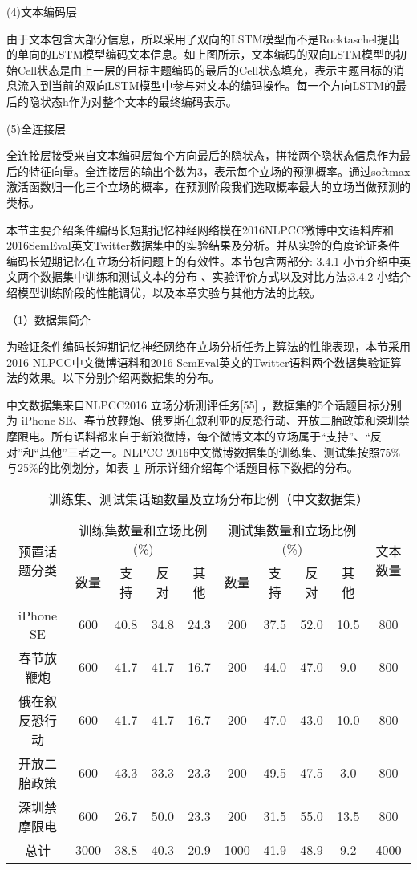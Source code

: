 (4)文本编码层

由于文本包含大部分信息，所以采用了双向的LSTM模型而不是Rocktaschel提出的单向的LSTM模型编码文本信息。如上图所示，文本编码的双向LSTM模型的初始Cell状态是由上一层的目标主题编码的最后的Cell状态填充，表示主题目标的消息流入到当前的双向LSTM模型中参与对文本的编码操作。每一个方向LSTM的最后的隐状态h作为对整个文本的最终编码表示。

(5)全连接层


全连接层接受来自文本编码层每个方向最后的隐状态，拼接两个隐状态信息作为最后的特征向量。全连接层的输出个数为3，表示每个立场的预测概率。通过softmax激活函数归一化三个立场的概率，在预测阶段我们选取概率最大的立场当做预测的类标。


本节主要介绍条件编码长短期记忆神经网络模在2016NLPCC微博中文语料库和2016SemEval英文Twitter数据集中的实验结果及分析。并从实验的角度论证条件编码长短期记忆在立场分析问题上的有效性。本节包含两部分: 3.4.1 小节介绍中英文两个数据集中训练和测试文本的分布 、实验评价方式以及对比方法;3.4.2 小结介绍模型训练阶段的性能调优，以及本章实验与其他方法的比较。


（1）数据集简介

为验证条件编码长短期记忆神经网络在立场分析任务上算法的性能表现，本节采用2016 NLPCC中文微博语料和2016 SemEval英文的Twitter语料两个数据集验证算法的效果。以下分别介绍两数据集的分布。

中文数据集来自NLPCC2016 立场分析测评任务[55] ，数据集的5个话题目标分别为 iPhone SE、春节放鞭炮、俄罗斯在叙利亚的反恐行动、开放二胎政策和深圳禁摩限电。所有语料都来自于新浪微博，每个微博文本的立场属于“支持”、“反对”和“其他”三者之一。NLPCC 2016中文微博数据集的训练集、测试集按照75\%与25\%的比例划分，如表~\ref{chinesedata}~所示详细介绍每个话题目标下数据的分布。
\begin{table}[htbp]
	\caption[table123]{训练集、测试集话题数量及立场分布比例（中文数据集）}
	\label{chinesedata}
	\vspace{0.5em}\centering\wuhao
	\begin{tabular}{cccccccccc}
		\toprule[1.5pt]
		\multirow{2}{*}{预置话题分类}& \multicolumn{4}{c}{训练集数量和立场比例(\%)} 
		& \multicolumn{4}{c}{测试集数量和立场比例(\%)}  &\multirow{2}{*}{文本数量}\\
		\cline{2-9}
		\quad&数量& 支持&反对&其他&数量& 支持&反对&其他 \\
		\midrule[1pt]
		iPhone SE&600&40.8&34.8&24.3&200&37.5&52.0&10.5&800\\
		春节放鞭炮&600&41.7&41.7&16.7&200&44.0&47.0&9.0&800\\
		俄在叙反恐行动&600&41.7&41.7&16.7&200&47.0&43.0&10.0&800\\
		开放二胎政策&600&43.3&33.3&23.3&200&49.5&47.5&3.0&800\\
		深圳禁摩限电&600&26.7&50.0&23.3&200&31.5&55.0&13.5&800\\
		总计&3000&38.8&40.3&20.9&1000&41.9&48.9&9.2&4000\\
		\bottomrule[1.5pt]
	\end{tabular}
\end{table}

